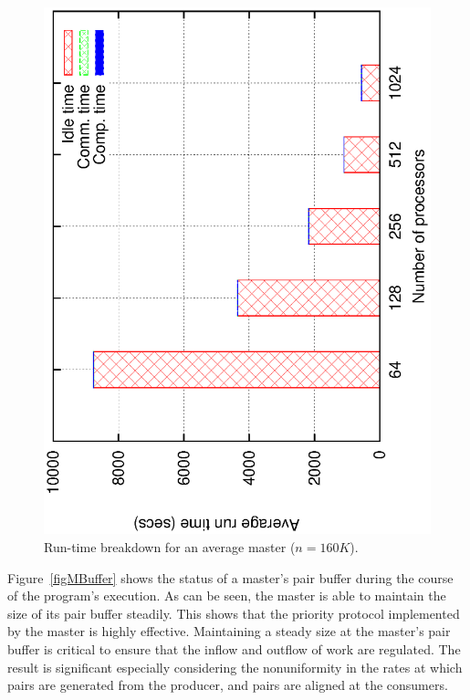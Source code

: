 \documentclass[10pt,journal,letterpaper,compsoc]{IEEEtran}
\begin{document}
\begin{figure}[thb]
\centerline{
						\includegraphics[angle=-90, scale=0.5]{msBreak.eps}
            }
\caption{
Run-time breakdown for an average master ($n=160K$).
}
\label{figMasterBreakdown}
\end{figure}


Figure~\ref{figMBuffer} shows the status of a master's pair buffer during the course of the program's execution. As can be seen, the master is able to maintain the size of its pair buffer steadily. This shows that the priority protocol implemented by the master is highly effective. Maintaining a steady size at the master's pair buffer is critical to ensure that the inflow and outflow of work are regulated. The result is significant especially considering the nonuniformity in the rates at which pairs are generated from the producer, and pairs are aligned at the consumers.
\end{document}
